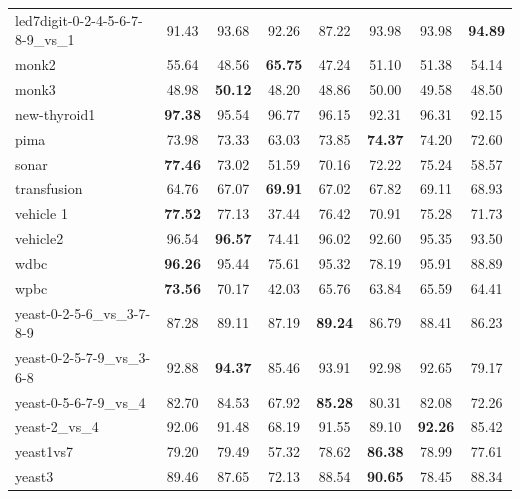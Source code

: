 \begin{table}[!p]
{\begin{tabular}{lccccccc}
led7digit-0-2-4-5-6-7-8-9\_vs\_1 & 91.43 & 93.68 & 92.26 & 87.22 & 93.98 & 93.98 & \textbf{94.89} \\
monk2 & 55.64 & 48.56 & \textbf{65.75} & 47.24 & 51.10 & 51.38 & 54.14 \\
monk3 & 48.98 & \textbf{50.12} & 48.20 & 48.86 & 50.00 & 49.58 & 48.50 \\
new-thyroid1 & \textbf{97.38} & 95.54 & 96.77 & 96.15 & 92.31 & 96.31 & 92.15 \\
pima & 73.98 & 73.33 & 63.03 & 73.85 & \textbf{74.37} & 74.20 & 72.60 \\
sonar & \textbf{77.46} & 73.02 & 51.59 & 70.16 & 72.22 & 75.24 & 58.57 \\
transfusion & 64.76 & 67.07 & \textbf{69.91} & 67.02 & 67.82 & 69.11 & 68.93 \\
vehicle 1 & \textbf{77.52} & 77.13 & 37.44 & 76.42 & 70.91 & 75.28 & 71.73 \\
vehicle2 & 96.54 & \textbf{96.57} & 74.41 & 96.02 & 92.60 & 95.35 & 93.50 \\
wdbc & \textbf{96.26} & 95.44 & 75.61 & 95.32 & 78.19 & 95.91 & 88.89 \\
wpbc & \textbf{73.56} & 70.17 & 42.03 & 65.76 & 63.84 & 65.59 & 64.41 \\
yeast-0-2-5-6\_vs\_3-7-8-9 & 87.28 & 89.11 & 87.19 & \textbf{89.24} & 86.79 & 88.41 & 86.23 \\
yeast-0-2-5-7-9\_vs\_3-6-8 & 92.88 & \textbf{94.37} & 85.46 & 93.91 & 92.98 & 92.65 & 79.17 \\
yeast-0-5-6-7-9\_vs\_4 & 82.70 & 84.53 & 67.92 & \textbf{85.28} & 80.31 & 82.08 & 72.26 \\
yeast-2\_vs\_4 & 92.06 & 91.48 & 68.19 & 91.55 & 89.10 & \textbf{92.26} & 85.42 \\
yeast1vs7 & 79.20 & 79.49 & 57.32 & 78.62 & \textbf{86.38} & 78.99 & 77.61 \\
yeast3 & 89.46 & 87.65 & 72.13 & 88.54 & \textbf{90.65} & 78.45 & 88.34 \\
\bottomrule
\end{tabular}}
\end{table}
